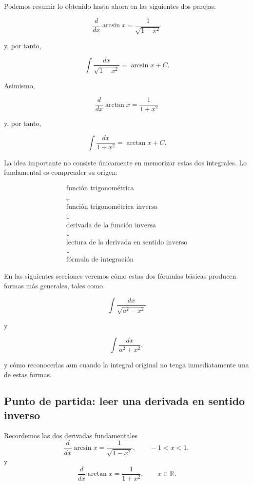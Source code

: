 \documentclass[12pt]{article}
\theoremstyle{definition}
\theoremstyle{remark}
\begin{document}
Podemos resumir lo obtenido hasta ahora en las siguientes dos parejas:

\[
\boxed{
\frac{d}{dx}\arcsin x
=
\frac{1}{\sqrt{1-x^2}}
}
\]

y, por tanto,

\[
\boxed{
\int\frac{dx}{\sqrt{1-x^2}}
=
\arcsin x+C.
}
\]

Asimismo,

\[
\boxed{
\frac{d}{dx}\arctan x
=
\frac{1}{1+x^2}
}
\]

y, por tanto,

\[
\boxed{
\int\frac{dx}{1+x^2}
=
\arctan x+C.
}
\]

La idea importante no consiste únicamente en memorizar estas dos
integrales. Lo fundamental es comprender su origen:

\[
\boxed{
\begin{array}{c}
\text{función trigonométrica}
\\[2mm]
\downarrow
\\[2mm]
\text{función trigonométrica inversa}
\\[2mm]
\downarrow
\\[2mm]
\text{derivada de la función inversa}
\\[2mm]
\downarrow
\\[2mm]
\text{lectura de la derivada en sentido inverso}
\\[2mm]
\downarrow
\\[2mm]
\text{fórmula de integración}
\end{array}
}
\]

En las siguientes secciones veremos cómo estas dos fórmulas básicas
producen formas más generales, tales como

\[
\int\frac{dx}{\sqrt{a^2-x^2}}
\]

y

\[
\int\frac{dx}{a^2+x^2},
\]

y cómo reconocerlas aun cuando la integral original no tenga
inmediatamente una de estas formas.
\subsection{Punto de partida: leer una derivada en sentido inverso}

Recordemos las dos derivadas fundamentales
\[
\frac{d}{dx}\arcsin x=\frac{1}{\sqrt{1-x^2}},
\qquad -1<x<1,
\]
y
\[
\frac{d}{dx}\arctan x=\frac{1}{1+x^2},
\qquad x\in\mathbb{R}.
\]
\end{document}
